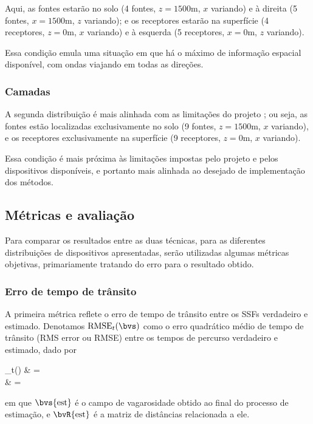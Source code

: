 Aqui, as fontes estarão no solo (4 fontes, $z = 1500\si{\meter}$, $x$ variando) e à direita (5 fontes, $x = 1500\si{\meter}$, $z$ variando); e os receptores estarão na superfície (4 receptores, $z = 0\si{\meter}$, $x$ variando) e à esquerda (5 receptores, $x = 0\si{\meter}$, $z$ variando).

Essa condição emula uma situação em que há o máximo de informação espacial disponível, com ondas viajando em todas as direções.

\subsubsection*{Camadas}

A segunda distribuição é mais alinhada com as limitações do projeto \cite{revisao_bibliografica}; ou seja, as fontes estão localizadas exclusivamente no solo (9 fontes, $z = 1500\si{\meter}$, $x$ variando), e os receptores exclusivamente na superfície (9 receptores, $z = 0\si{\meter}$, $x$ variando).

Essa condição é mais próxima às limitações impostas pelo projeto e pelos dispositivos disponíveis, e portanto mais alinhada ao desejado de implementação dos métodos.

\subsection{Métricas e avaliação}
\label{subsec:sec3:metricas}

Para comparar os resultados entre as duas técnicas, para as diferentes distribuições de dispositivos apresentadas, serão utilizadas algumas métricas objetivas, primariamente tratando do erro para o resultado obtido.

\subsubsection*{Erro de tempo de trânsito}
A primeira métrica reflete o erro de tempo de trânsito entre os SSFs verdadeiro e estimado. Denotamos $\rmse_{t}(\bvs)$ como o erro quadrático médio de tempo de trânsito (RMS error ou RMSE) entre os tempos de percurso verdadeiro e estimado, dado por
\begin{equations}
	\rmse_{t}(\bvs{\est})
	& =  \\
	& = \norm{\bvR{\est} \bvs{\est} - \bvt{\true}}
	\label{eq:sec3:rmse_t}
\end{equations}
em que $\bvs{\est}$ é o campo de vagarosidade obtido ao final do processo de estimação, e $\bvR{\est}$ é a matriz de distâncias relacionada a ele.

